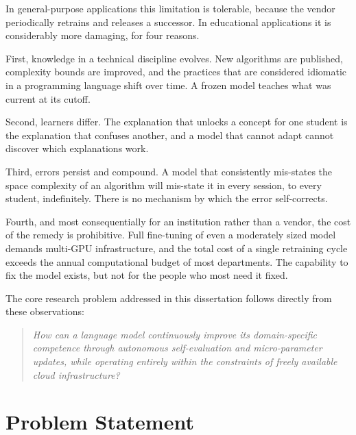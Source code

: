 \documentclass[12pt,a4paper]{report}
\begin{document}
In general-purpose applications this limitation is tolerable, because the vendor periodically retrains and releases a successor. In educational applications it is considerably more damaging, for four reasons.

First, knowledge in a technical discipline evolves. New algorithms are published, complexity bounds are improved, and the practices that are considered idiomatic in a programming language shift over time. A frozen model teaches what was current at its cutoff.

Second, learners differ. The explanation that unlocks a concept for one student is the explanation that confuses another, and a model that cannot adapt cannot discover which explanations work.

Third, errors persist and compound. A model that consistently mis-states the space complexity of an algorithm will mis-state it in every session, to every student, indefinitely. There is no mechanism by which the error self-corrects.

Fourth, and most consequentially for an institution rather than a vendor, the cost of the remedy is prohibitive. Full fine-tuning of even a moderately sized model demands multi-GPU infrastructure, and the total cost of a single retraining cycle exceeds the annual computational budget of most departments. The capability to fix the model exists, but not for the people who most need it fixed.

The core research problem addressed in this dissertation follows directly from these observations:

\begin{quote}
\textit{How can a language model continuously improve its domain-specific competence through autonomous self-evaluation and micro-parameter updates, while operating entirely within the constraints of freely available cloud infrastructure?}
\end{quote}

\section{Problem Statement}
\end{document}
